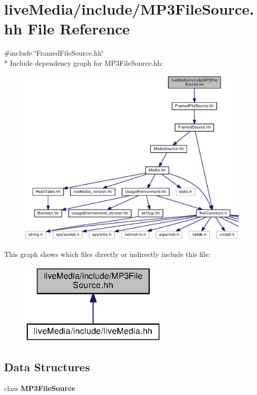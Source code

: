 \section{live\+Media/include/\+M\+P3\+File\+Source.hh File Reference}
\label{MP3FileSource_8hh}
{\ttfamily \#include \char`\"{}Framed\+File\+Source.\+hh\char`\"{}}\\*
Include dependency graph for M\+P3\+File\+Source.\+hh\+:
\nopagebreak
\begin{figure}[H]
\begin{center}
\leavevmode
\includegraphics[width=350pt]{MP3FileSource_8hh__incl}
\end{center}
\end{figure}
This graph shows which files directly or indirectly include this file\+:
\nopagebreak
\begin{figure}[H]
\begin{center}
\leavevmode
\includegraphics[width=204pt]{MP3FileSource_8hh__dep__incl}
\end{center}
\end{figure}
\subsection*{Data Structures}
\begin{DoxyCompactItemize}
\item 
class {\bf M\+P3\+File\+Source}
\end{DoxyCompactItemize}
